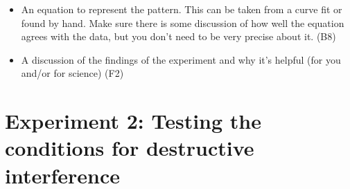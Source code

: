 \begin{steps}
\begin{itemize}
		\item An equation to represent the pattern. This can be taken from a curve fit or found by hand. Make sure there is some discussion of how well the equation agrees with the data, but you don't need to be very precise about it. (B8)
		
		\item A discussion of the findings of the experiment and why it's helpful (for you and/or for science) (F2)
	\end{itemize}

\end{steps}

%
%
%	
%	
%	
%	
%	
%	
%	

\section{Experiment 2: Testing the conditions for destructive interference}

